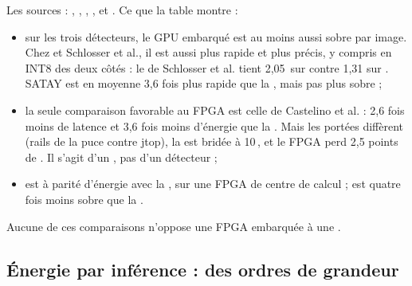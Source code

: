 Les sources : \citet{arxiv-1909.09709-skynet-hardware-efficient-method-object}\pp,
\citet{arxiv-2304.11580-framework-benchmarking-real-time-embedded},
\citet{2023-montgomerie-corcoran-satay-streaming-architecture-toolflow-accelerating},
\citet{arxiv-2407.17647-energy-efficient-artefact-detection-accelerator},
\citet{2022-sun-f-lic-fpga-learned-image} et
\citet{2024-aggarwal-chameleon-dual-memory-replay-online}. Ce que la table montre :
\begin{itemize}
  \item sur les trois détecteurs, le GPU embarqué est au moins aussi sobre par image.
    Chez \pp{} et Schlosser et al., il est aussi plus rapide et plus précis, y
    compris en INT8 des deux côtés : le  de Schlosser et al. tient 2,05\, sur
     contre 1,31 sur . SATAY est en moyenne 3,6 fois plus rapide que la
     , mais pas plus sobre ;
  \item la seule comparaison favorable au FPGA est celle de Castelino et al. : 2,6 fois
    moins de latence et 3,6 fois moins d'énergie que la  . Mais les
    portées diffèrent (rails de la puce contre jtop), la  est bridée à 10\,, et le
    FPGA perd 2,5 points de . Il s'agit d'un , pas d'un détecteur ;
  \item {} est à parité d'énergie avec la , sur une FPGA de centre de calcul ;
     est quatre fois moins sobre que la  \deduit.
\end{itemize}
Aucune de ces comparaisons n'oppose une FPGA embarquée à une  \deduit.

\subsection{Énergie par inférence : des ordres de grandeur}

